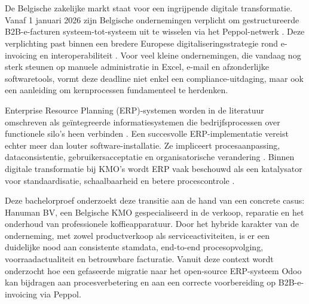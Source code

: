 
\chapter{}%
\label{ch:inleiding}

De Belgische zakelijke markt staat voor een ingrijpende digitale transformatie. Vanaf 1 januari 2026 zijn Belgische ondernemingen verplicht om gestructureerde B2B-e-facturen systeem-tot-systeem uit te wisselen via het Peppol-netwerk \autocite{Deloitte_2024}. Deze verplichting past binnen een bredere Europese digitaliseringsstrategie rond e-invoicing en interoperabiliteit \autocite{EuropeanCommission_2025}. Voor veel kleine ondernemingen, die vandaag nog sterk steunen op manuele administratie in Excel, e-mail en afzonderlijke softwaretools, vormt deze deadline niet enkel een compliance-uitdaging, maar ook een aanleiding om kernprocessen fundamenteel te herdenken.

Enterprise Resource Planning (ERP)-systemen worden in de literatuur omschreven als geïntegreerde informatiesystemen die bedrijfsprocessen over functionele silo's heen verbinden \textcite{Davenport1998}. Een succesvolle ERP-implementatie vereist echter meer dan louter software-installatie. Ze impliceert procesaanpassing, dataconsistentie, gebruikersacceptatie en organisatorische verandering \autocite{Nah2001}. Binnen digitale transformatie bij KMO's wordt ERP vaak beschouwd als een katalysator voor standaardisatie, schaalbaarheid en betere procescontrole \autocite{Matt2015,Vial2019}.

Deze bachelorproef onderzoekt deze transitie aan de hand van een concrete casus: Hanuman BV, een Belgische KMO gespecialiseerd in de verkoop, reparatie en het onderhoud van professionele koffieapparatuur. Door het hybride karakter van de onderneming, met zowel productverkoop als serviceactiviteiten, is er een duidelijke nood aan consistente stamdata, end-to-end procesopvolging, voorraadactualiteit en betrouwbare facturatie. Vanuit deze context wordt onderzocht hoe een gefaseerde migratie naar het open-source ERP-systeem Odoo kan bijdragen aan procesverbetering en aan een correcte voorbereiding op B2B-e-invoicing via Peppol.

\section{}%
\label{sec:probleemstelling}

